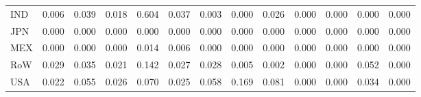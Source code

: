 \begin{table}[htbp]
\begin{tabular}{lcccccccccccc}
  IND & \textcolor[RGB]{91,59,164}{0.006} & \textcolor[RGB]{42,27,212}{0.039} & \textcolor[RGB]{83,54,172}{0.018} & \textcolor[RGB]{0,0,255}{0.604} & \textcolor[RGB]{45,29,210}{0.037} & \textcolor[RGB]{100,65,155}{0.003} & \textcolor[RGB]{255,165,0}{0.000} & \textcolor[RGB]{70,45,185}{0.026} & \textcolor[RGB]{255,165,0}{0.000} & \textcolor[RGB]{255,165,0}{0.000} & \textcolor[RGB]{255,165,0}{0.000} & \textcolor[RGB]{255,165,0}{0.000} \\ 
  JPN & \textcolor[RGB]{255,165,0}{0.000} & \textcolor[RGB]{255,165,0}{0.000} & \textcolor[RGB]{255,165,0}{0.000} & \textcolor[RGB]{255,165,0}{0.000} & \textcolor[RGB]{255,165,0}{0.000} & \textcolor[RGB]{255,165,0}{0.000} & \textcolor[RGB]{255,165,0}{0.000} & \textcolor[RGB]{255,165,0}{0.000} & \textcolor[RGB]{255,165,0}{0.000} & \textcolor[RGB]{255,165,0}{0.000} & \textcolor[RGB]{255,165,0}{0.000} & \textcolor[RGB]{255,165,0}{0.000} \\ 
  MEX & \textcolor[RGB]{255,165,0}{0.000} & \textcolor[RGB]{255,165,0}{0.000} & \textcolor[RGB]{255,165,0}{0.000} & \textcolor[RGB]{89,58,166}{0.014} & \textcolor[RGB]{94,61,162}{0.006} & \textcolor[RGB]{119,77,136}{0.000} & \textcolor[RGB]{255,165,0}{0.000} & \textcolor[RGB]{255,165,0}{0.000} & \textcolor[RGB]{255,165,0}{0.000} & \textcolor[RGB]{255,165,0}{0.000} & \textcolor[RGB]{255,165,0}{0.000} & \textcolor[RGB]{255,165,0}{0.000} \\ 
  RoW & \textcolor[RGB]{62,40,193}{0.029} & \textcolor[RGB]{49,32,206}{0.035} & \textcolor[RGB]{77,50,178}{0.021} & \textcolor[RGB]{6,4,249}{0.142} & \textcolor[RGB]{66,43,189}{0.027} & \textcolor[RGB]{64,41,191}{0.028} & \textcolor[RGB]{96,62,159}{0.005} & \textcolor[RGB]{106,69,149}{0.002} & \textcolor[RGB]{255,165,0}{0.000} & \textcolor[RGB]{255,165,0}{0.000} & \textcolor[RGB]{38,25,217}{0.052} & \textcolor[RGB]{255,165,0}{0.000} \\ 
  USA & \textcolor[RGB]{74,48,181}{0.022} & \textcolor[RGB]{36,23,219}{0.055} & \textcolor[RGB]{68,44,187}{0.026} & \textcolor[RGB]{28,18,227}{0.070} & \textcolor[RGB]{72,47,183}{0.025} & \textcolor[RGB]{34,22,221}{0.058} & \textcolor[RGB]{4,3,251}{0.169} & \textcolor[RGB]{23,15,232}{0.081} & \textcolor[RGB]{255,165,0}{0.000} & \textcolor[RGB]{255,165,0}{0.000} & \textcolor[RGB]{55,36,200}{0.034} & \textcolor[RGB]{255,165,0}{0.000} \\ 
   \hline
\end{tabular}
\end{table}
